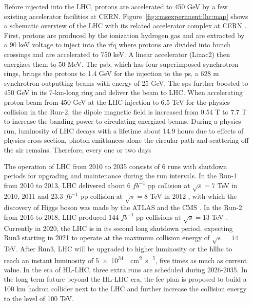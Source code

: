Before injected into the LHC, protons are accelerated to 450 GeV by a few existing accelerator facilities at CERN. Figure~\ref{fig:cmsexperiment:lhc:map} shows a schematic overview of the LHC with its related accelerator complex at CERN \cite{exhep:lhcInject:Benedikt:2004wm}. First, protons are produced by the ionization hydrogen gas and are extracted by a 90 keV voltage to inject into the \acrfull{rfq} where protons are divided into bunch crossings and are accelerated to 750 keV. A linear accelerator (Linac2) then energizes them to 50 MeV. The \acrfull{psb}, which has four superimposed synchrotron rings, brings the protons to 1.4 GeV for the injection to the \acrfull{ps}, a 628 m synchrotron outputting beams with energy of 25 GeV. The \acrfull{sps} further boosted to 450 GeV in its 7-km-long ring and deliver the beam to LHC. When accelerating proton beam from 450 GeV at the LHC injection to 6.5 TeV for the physics collision in the Run-2, the dipole magnetic field is increased from 0.54 T to 7.7 T to increase the banding power to circulating energized beams. During a physics run, luminosity of LHC decays with a lifetime about 14.9 hours \cite{exhep:lhc:Evans:2008zzb} due to effects of physics cross-section, photon emittances alone the circular path and scattering off the air remains. Therefore, every one or two days



The operation of LHC from 2010 to 2035 consists of 6 runs with shutdown periods for upgrading and maintenance during the run intervals. In the Run-1 from 2010 to 2013, LHC delivered about 6 $fb^{-1}$ pp collision at $\sqrt{s}=7$ TeV in 2010, 2011 and 23.3 $fb^{-1}$ pp collision at $\sqrt{s}=8$ TeV in 2012 \cite{cms:publicLumiInfo}, with which the discovery of Higgs boson was made by the ATLAS \cite{exhep:atlasHiggsDisc:Aad:2012tfa} and the CMS \cite{exhep:cmsHiggsDisc:Chatrchyan:2012ufa}. In the Run-2 from 2016 to 2018, LHC produced 144 $fb^{-1}$ pp collisions at $\sqrt{s}=13$ TeV \cite{cms:publicLumiInfo}. Currently in 2020, the LHC is in its second long shutdown period, expecting Run3 starting in 2021 to operate at the maximum collision energy of $\sqrt{s}=14$ TeV. After Run3, LHC will be upgraded to higher luminosity or the \acrfull{hllhc} to reach an instant luminosity of \SI{5e34}{\per\cm\squared \per\s}, five times as much as current value. In the era of HL-LHC, three extra runs are scheduled during 2026-2035. In the long term future beyond the HL-LHC era, the \acrfull{fcc} \cite{exhep:fcc:Benedikt:2715354} plan is proposed to build a 100 km hadron collider next to the LHC and further increase the collision energy to the level of 100 TeV.